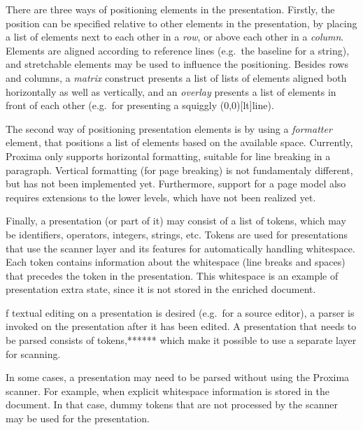 There are three ways of positioning elements in the presentation. Firstly, the position can be specified relative to other elements in the presentation, by placing a list of elements next to each other in a {\em row}, or above each other in a {\em column}. Elements are aligned according to reference lines (e.g.\ the baseline for a string), and stretchable elements may be used to influence the positioning. Besides rows and columns, a {\em matrix} construct presents a list of lists of elements aligned both horizontally as well as vertically, and an {\em overlay} presents a list of elements in front of each other (e.g.\ for presenting a squiggly \makebox(0,0)[lt]{}line). 

The second way of positioning presentation elements is by using a {\em formatter} element, that positions a list of elements based on the available space. Currently, Proxima only supports horizontal formatting, suitable for line breaking in a paragraph. Vertical formatting (for page breaking) is not fundamentaly different, but has not been implemented yet. Furthermore, support for a page model also requires extensions to the lower levels, which have not been realized yet.

Finally, a presentation (or part of it) may consist of a list of tokens, which may be identifiers, operators, integers, strings, etc. Tokens are used for presentations that use the scanner layer and its features for automatically handling whitespace. Each token contains information about the whitespace (line breaks and spaces) that precedes the token in the presentation. This whitespace is an example of presentation extra state, since it is not stored in the enriched document. 

\bc f textual editing on a presentation is desired (e.g.\ for a source editor), a parser is invoked on the presentation after it has been edited. A presentation that needs to be parsed consists of tokens,****** which make it possible to use a separate layer for scanning. \ec

\bc In some cases, a presentation may need to be parsed without using the Proxima scanner. For example, when explicit whitespace information is stored in the document. In that case, dummy tokens that are not processed by the scanner may be used for the presentation. \ec

